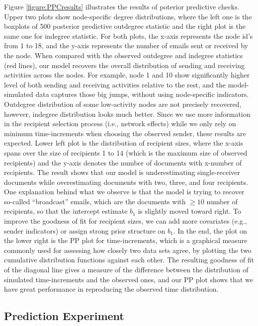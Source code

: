 \documentclass[12pt]{article}
\begin{document}
	Figure \ref{figure:PPCresults} illustrates the results of poterior predictive checks. Upper two plots show node-specific degree distributions, where the left one is the boxplots of 500 posterior predictive outdegree statistic and the right plot is the same one for indegree statistic. For both plots, the x-axis represents the node id's from 1 to 18, and the y-axis represents the number of emails sent or received by the node. When compared with the observed outdegree and indegree statistics (red lines), our model recovers the overall distribution of sending and receiving activities across the nodes. For example, node 1 and 10 show significantly higher level of both sending and receiving activities relative to the rest, and the model-simulated data captures those big jumps, without using node-specific indicators. Outdegree distribution of some low-activity nodes are not precisely recovered, however, indegree distribution looks much better. Since we use more information in the recipient selection process (i.e., network effects) while we only rely on minimum time-increments when choosing the observed sender, these results are expected. Lower left plot is the distribution of recipient sizes, where the x-axis spans over the size of recipients 1 to 14 (which is the maximum size of observed recipients) and the y-axis denotes the number of documents with x-number of recipients. The result shows that our model is underestimating single-receiver documents while overestimating documents with two, three, and four recipients. One explanation behind what we observe is that the model is trying to recover so-called ``broadcast'' emails, which are the documents with $\geq 10$ number of recipients, so that the intercept estimate $b_1$ is slightly moved toward right. To improve the goodness of fit for recipient sizes, we can add more covariates (e.g., sender indicators) or assign strong prior structure on $b_1$. In the end, the plot on the lower right is the PP plot for time-increments, which is a graphical measure commonly used for assessing how closely two data sets agree, by plotting the two cumulative distribution functions against each other. The resulting goodness of fit of the diagonal line gives a measure of the difference between the distribution of simulated time-increments and the observed ones, and our PP plot shows that we have great performance in reproducing the observed time distribution.
	\subsection{Prediction Experiment}\label{subsec:Experiment_email}
	
\end{document}
